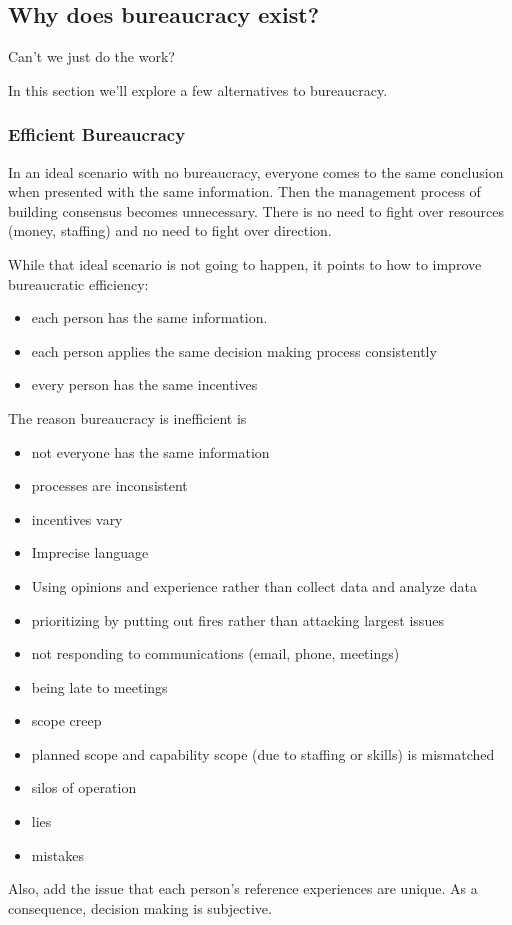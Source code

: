 \subsection{Why does bureaucracy exist? \label{sec:alternatives_to_bureaucracy}}
Can't we just do the work?

In this section we'll explore a few alternatives to bureaucracy. 




\subsubsection{Efficient Bureaucracy}

In an ideal scenario with no bureaucracy, everyone comes to the same conclusion when presented with the same information. Then the management process of building consensus becomes unnecessary. There is no need to fight over resources (money, staffing) and no need to fight over direction.

While that ideal scenario is not going to happen, it points to how to improve bureaucratic efficiency:
\begin{itemize}
\item each person has the same information. 
\item each person applies the same decision making process consistently
\item every person has the same incentives
\end{itemize}
The reason bureaucracy is inefficient is
\begin{itemize}
    \item not everyone has the same information
    \item processes are inconsistent
    \item incentives vary
    \item Imprecise language
    \item Using opinions and experience rather than collect data and analyze data
    \item prioritizing by putting out fires rather than attacking largest issues
    \item not responding to communications (email, phone, meetings)
    \item being late to meetings
    \item scope creep
    \item planned scope and capability scope (due to staffing or skills) is mismatched
    \item silos of operation
    \item lies
    \item mistakes
\end{itemize}
Also, add the issue that each person's reference experiences are unique. As a consequence, decision making is subjective. 





